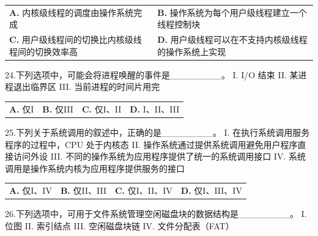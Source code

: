 \documentclass[UTF8,11pt]{ctexart}
\begin{document}
\begin{center}\begin{tabular}{>{\raggedright\arraybackslash}p{\dimexpr(\linewidth-4\tabcolsep)/2\relax}>{\raggedright\arraybackslash}p{\dimexpr(\linewidth-4\tabcolsep)/2\relax}}
\textbf{A.} 内核级线程的调度由操作系统完成 & \textbf{B.} 操作系统为每个用户级线程建立一个线程控制块\\[.35em]
\textbf{C.} 用户级线程间的切换比内核级线程间的切换效率高 & \textbf{D.} 用户级线程可以在不支持内核级线程的操作系统上实现\\[.35em]\end{tabular}\end{center}

24.下列选项中，可能会将进程唤醒的事件是\_\_\_\_\_\_\_\_。 I. I/O 结束 II. 某进程退出临界区 III. 当前进程的时间片用完


\begin{center}\begin{tabular}{>{\raggedright\arraybackslash}p{\dimexpr(\linewidth-8\tabcolsep)/4\relax}>{\raggedright\arraybackslash}p{\dimexpr(\linewidth-8\tabcolsep)/4\relax}>{\raggedright\arraybackslash}p{\dimexpr(\linewidth-8\tabcolsep)/4\relax}>{\raggedright\arraybackslash}p{\dimexpr(\linewidth-8\tabcolsep)/4\relax}}
\textbf{A.} 仅I & \textbf{B.} 仅III & \textbf{C.} 仅I、II & \textbf{D.} I、II、III\\[.35em]\end{tabular}\end{center}

25.下列关于系统调用的叙述中，正确的是\_\_\_\_\_\_\_\_。 I. 在执行系统调用服务程序的过程中，CPU 处于内核态 II. 操作系统通过提供系统调用避免用户程序直接访问外设 III. 不同的操作系统为应用程序提供了统一的系统调用接口 IV. 系统调用是操作系统内核为应用程序提供服务的接口


\begin{center}\begin{tabular}{>{\raggedright\arraybackslash}p{\dimexpr(\linewidth-8\tabcolsep)/4\relax}>{\raggedright\arraybackslash}p{\dimexpr(\linewidth-8\tabcolsep)/4\relax}>{\raggedright\arraybackslash}p{\dimexpr(\linewidth-8\tabcolsep)/4\relax}>{\raggedright\arraybackslash}p{\dimexpr(\linewidth-8\tabcolsep)/4\relax}}
\textbf{A.} 仅I、IV & \textbf{B.} 仅II、III & \textbf{C.} 仅I、II、IV & \textbf{D.} 仅I、III、IV\\[.35em]\end{tabular}\end{center}

26.下列选项中，可用于文件系统管理空闲磁盘块的数据结构是\_\_\_\_\_\_\_\_。 I. 位图 II. 索引结点 III. 空闲磁盘块链 IV. 文件分配表（FAT）
\end{document}
